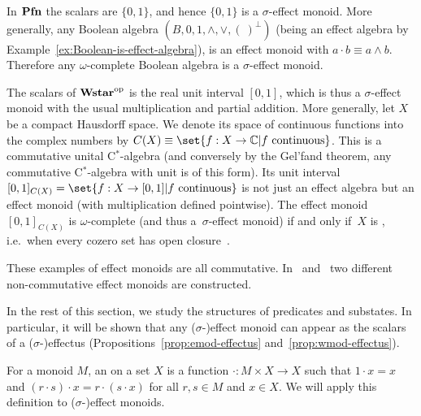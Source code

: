 \documentclass[%
	submission,
copyright,creativecommons,UKenglish]{eptcs}
\begin{document}
\begin{example}\label{ex:booleanalgebra}
In $\mathbf{Pfn}$ the scalars are $\{0,1\}$, and hence $\{0,1\}$ is a $\sigma$-effect monoid.
More generally, any Boolean algebra $(B,0,1,\wedge,\vee,(\ )^\perp)$ (being an effect algebra by Example~\ref{ex:Boolean-is-effect-algebra}),
    is an effect monoid with $a\cdot b \equiv a\wedge b$.
Therefore any $\omega$-complete Boolean algebra
is a $\sigma$-effect monoid.
\end{example}

\begin{example}\label{ex:CX}
  The scalars of $\mathbf{Wstar}^{\mathrm{op}}$ is the real unit interval $[0,1]$,
  which is thus a $\sigma$-effect monoid
  with the usual multiplication and partial addition.
  More generally, let $X$ be a compact Hausdorff space. We denote its space of
    continuous functions into the complex numbers by
    $C(X)\equiv\set{f:X\rightarrow \C| f \text{ continuous}}$. This is
    a commutative unital C$^*$-algebra
    (and conversely by the Gel'fand theorem, any
    commutative C$^*$-algebra with unit is of this form).
    Its unit interval
    $[0,1]_{C(X)} = \set{f:X\rightarrow [0,1]| f \text{ continuous}}$
    is not just an effect algebra but an effect monoid
    (with multiplication defined pointwise).
    The effect monoid~$[0,1]_{C(X)}$ is $\omega$-complete
        (and thus a~$\sigma$-effect monoid)
        if and only if~$X$ is ,
            i.e.~when every cozero set has open
            closure~\cite[1H \& 3N.5]{gillman2013rings}.
\end{example}
These examples of effect monoids are all commutative. In~\cite[Ex.~4.3.9]{Cho2019PhD} and~\cite[Cor.~51]{basmaster}
two different non-commutative effect monoids are constructed.

In the rest of this section,
we study the structures of predicates and substates.
In particular, it will be shown that
any ($\sigma$-)effect monoid can appear as the scalars of
a ($\sigma$-)effectus
(Propositions~\ref{prop:emod-effectus}
and~\ref{prop:wmod-effectus}).

For a monoid $M$,
an  on a set $X$ is
a function ${\cdot}\colon M\times X\to X$
such that $1\cdot x=x$ and $(r\cdot s)\cdot x=r\cdot(s\cdot x)$
for all $r,s\in M$ and $x\in X$.
We will apply this definition to ($\sigma$-)effect monoids.
\end{document}
